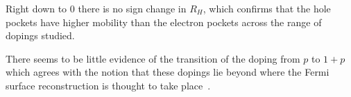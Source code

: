 Right down to \unit{0}{\kelvin} there is no sign change in $R_H$, which confirms that the hole pockets have higher mobility than the electron pockets across the range of dopings studied.




There seems to be little evidence of the transition of the doping from $p$ to $1+p$ which agrees with the notion that these dopings lie beyond where the Fermi surface reconstruction is thought to take place~\cite{LeBoeuf2007}. 




